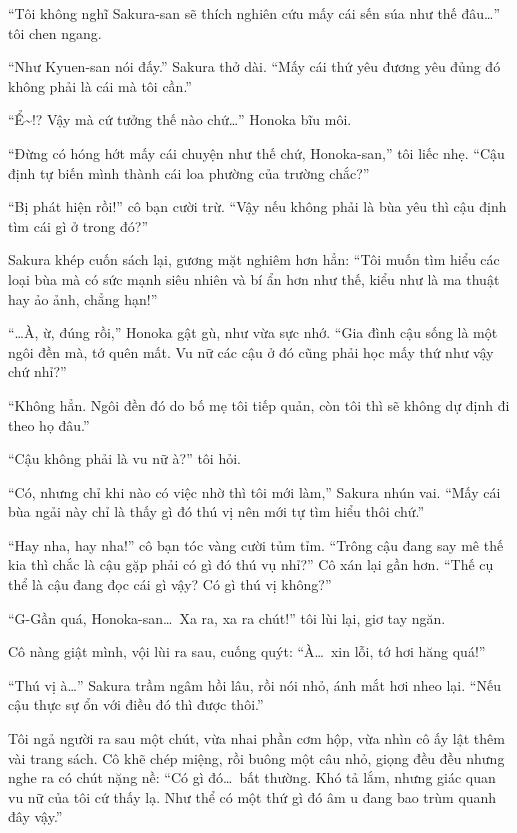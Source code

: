 \documentclass[../main.tex]{subfiles}
\begin{document}
``Tôi không nghĩ Sakura-san sẽ thích nghiên cứu mấy cái sến súa như thế đâu\dots'' tôi chen ngang.

``Như Kyuen-san nói đấy.'' Sakura thở dài. ``Mấy cái thứ yêu đương yêu đủng đó không phải là cái mà tôi cần.''

``Ể\~{}!? Vậy mà cứ tưởng thế nào chứ\dots'' Honoka bĩu môi.

``Đừng có hóng hớt mấy cái chuyện như thế chứ, Honoka-san,'' tôi liếc nhẹ. ``Cậu định tự biến mình thành cái loa phường của trường chắc?''

``Bị phát hiện rồi!'' cô bạn cười trừ. ``Vậy nếu không phải là bùa yêu thì cậu định tìm cái gì ở trong đó?''

Sakura khép cuốn sách lại, gương mặt nghiêm hơn hẳn: ``Tôi muốn tìm hiểu các loại bùa mà có sức mạnh siêu nhiên và bí ẩn hơn như thế, kiểu như là ma thuật hay ảo ảnh, chẳng hạn!''

``\dots À, ừ, đúng rồi,'' Honoka gật gù, như vừa sực nhớ. ``Gia đình cậu sống là một ngôi đền mà, tớ quên mất. Vu nữ các cậu ở đó cũng phải học mấy thứ như vậy chứ nhỉ?''

``Không hẳn. Ngôi đền đó do bố mẹ tôi tiếp quản, còn tôi thì sẽ không dự định đi theo họ đâu.''

``Cậu không phải là vu nữ à?'' tôi hỏi.

``Có, nhưng chỉ khi nào có việc nhờ thì tôi mới làm,'' Sakura nhún vai. ``Mấy cái bùa ngải này chỉ là thấy gì đó thú vị nên mới tự tìm hiểu thôi chứ.''

``Hay nha, hay nha!'' cô bạn tóc vàng cười tủm tỉm. ``Trông cậu đang say mê thế kia thì chắc là cậu gặp phải có gì đó thú vụ nhỉ?'' Cô xán lại gần hơn. ``Thế cụ thể là cậu đang đọc cái gì vậy? Có gì thú vị không?''

``G-Gần quá, Honoka-san\dots\ Xa ra, xa ra chút!'' tôi lùi lại, giơ tay ngăn.

Cô nàng giật mình, vội lùi ra sau, cuống quýt: ``À\dots\ xin lỗi, tớ hơi hăng quá!''

``Thú vị à\dots'' Sakura trầm ngâm hồi lâu, rồi nói nhỏ, ánh mắt hơi nheo lại. ``Nếu cậu thực sự ổn với điều đó thì được thôi.''

Tôi ngả người ra sau một chút, vừa nhai phần cơm hộp, vừa nhìn cô ấy lật thêm vài trang sách. Cô khẽ chép miệng, rồi buông một câu nhỏ, giọng đều đều nhưng nghe ra có chút nặng nề: ``Có gì đó\dots\ bất thường. Khó tả lắm, nhưng giác quan vu nữ của tôi cứ thấy lạ. Như thể có một thứ gì đó âm u đang bao trùm quanh đây vậy.''
\end{document}
